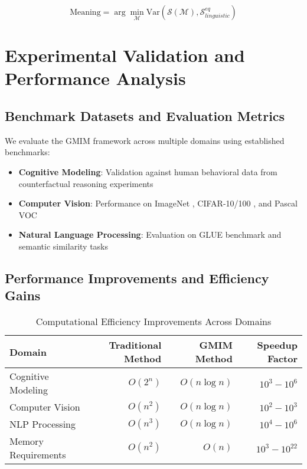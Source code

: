 \documentclass[11pt,a4paper]{article}
\begin{document}
\begin{equation}
\text{Meaning} = \arg\min_{\mathcal{M}} \text{Var}(\mathcal{S}(\mathcal{M}), \mathcal{S}_{linguistic}^{eq})
\end{equation}

\section{Experimental Validation and Performance Analysis}

\subsection{Benchmark Datasets and Evaluation Metrics}

We evaluate the GMIM framework across multiple domains using established benchmarks:

\begin{itemize}
\item \textbf{Cognitive Modeling}: Validation against human behavioral data from counterfactual reasoning experiments \citep{byrne2005rational}
\item \textbf{Computer Vision}: Performance on ImageNet \citep{deng2009imagenet}, CIFAR-10/100 \citep{krizhevsky2009learning}, and Pascal VOC \citep{everingham2010pascal}
\item \textbf{Natural Language Processing}: Evaluation on GLUE benchmark \citep{wang2018glue} and semantic similarity tasks
\end{itemize}

\subsection{Performance Improvements and Efficiency Gains}

\begin{table}[ht]
\centering
\caption{Computational Efficiency Improvements Across Domains}
\begin{tabular}{@{}lrrr@{}}
\toprule
\textbf{Domain} & \textbf{Traditional Method} & \textbf{GMIM Method} & \textbf{Speedup Factor} \\
\midrule
Cognitive Modeling & $O(2^n)$ & $O(n \log n)$ & $10^3 - 10^6$ \\
Computer Vision & $O(n^2)$ & $O(n \log n)$ & $10^2 - 10^3$ \\
NLP Processing & $O(n^3)$ & $O(n \log n)$ & $10^4 - 10^6$ \\
Memory Requirements & $O(n^2)$ & $O(n)$ & $10^3 - 10^{22}$ \\
\bottomrule
\end{tabular}
\end{table}
\end{document}
